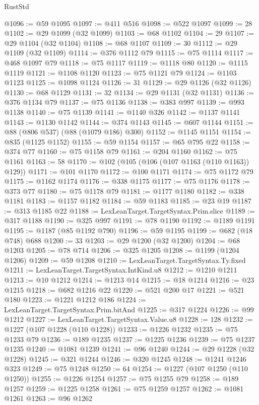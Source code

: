 \begin{lexlean}{RustStd}
\begin{coremodule}
@1096 := @59 @1095
@1097 := @411 @516
@1098 := @522 @1097
@1099 := 28
@1102 := @29 @1099 (@32 @1099)
@1103 := @68 @1102
@1104 := 29
@1107 := @29 @1104 (@32 @1104)
@1108 := @68 @1107
@1109 := 30
@1112 := @29 @1109 (@32 @1109)
@1114 := @376 @1112 @79
@1115 := @75 @1114
@1117 := @468 @1097 @79
@1118 := @75 @1117
@1119 := @1118 @80
@1120 := @1115 @1119
@1121 := @1108 @1120
@1123 := @75 @1121 @79
@1124 := @1103 @1123
@1125 := @1098 @1124
@1126 := 31
@1129 := @29 @1126 (@32 @1126)
@1130 := @68 @1129
@1131 := 32
@1134 := @29 @1131 (@32 @1131)
@1136 := @376 @1134 @79
@1137 := @75 @1136
@1138 := @383 @997
@1139 := @993 @1138
@1140 := @75 @1139
@1141 := @1140 @326
@1142 := @1137 @1141
@1143 := @1130 @1142
@1144 := @374 @1143
@1145 := @607 @1144
@1151 := @88 (@806 @537) (@88 (@1079 @186) @300)
@1152 := @1145 @1151
@1154 := @835 (@1125 @1152)
@1155 := @59 @1154
@1157 := @65 @795 @22
@1158 := @374 @77
@1160 := @75 @1158 @79
@1161 := @204 @1160
@1162 := @75 @1161
@1163 := 58
@1170 := @102 (@105 (@106 (@107 @1163 (@110 @1163)) @129))
@1171 := @101 @1170
@1172 := @100 @1171
@1174 := @75 @1172 @79
@1175 := @1162 @1174
@1176 := @338 @1175
@1177 := @75 @1176
@1178 := @373 @77
@1180 := @75 @1178 @79
@1181 := @1177 @1180
@1182 := @338 @1181
@1183 := @1157 @1182
@1184 := @59 @1183
@1185 := @23 @19
@1187 := @313 @1185 @22
@1188 := LexLeanTarget.TargetSyntax.Prim.slice
@1189 := @317 @1188
@1190 := @325 @997
@1191 := @78 @1190
@1192 := @1189 @1191
@1195 := @1187 (@85 @1192 @790)
@1196 := @59 @1195
@1199 := @682 (@18 @748) @688
@1200 := 33
@1203 := @29 @1200 (@32 @1200)
@1204 := @68 @1203
@1205 := @78 @714
@1206 := @325 @1205
@1208 := @1199 (@1204 @1206)
@1209 := @59 @1208
@1210 := LexLeanTarget.TargetSyntax.Ty.fixed
@1211 := LexLeanTarget.TargetSyntax.IntKind.u8
@1212 := @1210 @1211
@1213 := @10 @1212
@1214 := @1213 @14
@1215 := @18 @1214
@1216 := @23 @1215
@1218 := @682 @1216 @22
@1220 := @521 @200 @17
@1221 := @521 @180
@1223 := @1221 @1212 @186
@1224 := LexLeanTarget.TargetSyntax.Prim.bitAnd
@1225 := @317 @1224
@1226 := @99 @1212
@1227 := LexLeanTarget.TargetSyntax.Value.u8
@1228 := 128
@1232 := @1227 (@107 @1228 (@110 @1228))
@1233 := @1226 @1232
@1235 := @75 @1233 @79
@1236 := @189 @1235
@1237 := @1225 @1236
@1239 := @75 @1237 @1235
@1240 := @1081 @1239
@1241 := @96 @1240
@1244 := @29 @1228 (@32 @1228)
@1245 := @321 @1244
@1246 := @320 @1245
@1248 := @1241 @1246 @323
@1249 := @75 @1248
@1250 := 64
@1254 := @1227 (@107 @1250 (@110 @1250))
@1255 := @1226 @1254
@1257 := @75 @1255 @79
@1258 := @189 @1257
@1259 := @1225 @1258
@1261 := @75 @1259 @1257
@1262 := @1081 @1261
@1263 := @96 @1262

\end{coremodule}
\end{lexlean}
